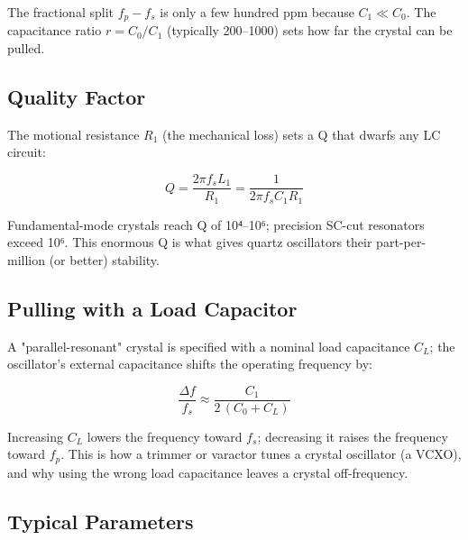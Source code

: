       

The fractional split $f_p-f_s$ is only a few hundred ppm because $C_1\ll C_0$. The capacitance ratio $r=C_0/C_1$ (typically 200–1000) sets how far the crystal can be pulled.

      

\subsection{Quality Factor}

      

The motional resistance $R_1$ (the mechanical loss) sets a Q that dwarfs any LC circuit:

      
\[Q = \dfrac{2\pi f_s L_1}{R_1} = \dfrac{1}{2\pi f_s C_1 R_1}\]

      

Fundamental-mode crystals reach Q of 10⁴–10⁶; precision SC-cut resonators exceed 10⁶. This enormous Q is what gives quartz oscillators their part-per-million (or better) stability.

      

\subsection{Pulling with a Load Capacitor}

      

A "parallel-resonant" crystal is specified with a nominal load capacitance $C_L$; the oscillator's external capacitance shifts the operating frequency by:

      
\[\dfrac{\Delta f}{f_s}\approx\dfrac{C_1}{2\,(C_0+C_L)}\]

      

Increasing $C_L$ lowers the frequency toward $f_s$; decreasing it raises the frequency toward $f_p$. This is how a trimmer or varactor tunes a crystal oscillator (a VCXO), and why using the wrong load capacitance leaves a crystal off-frequency.

      

\subsection{Typical Parameters}

      
        
        
        
        
        
      

